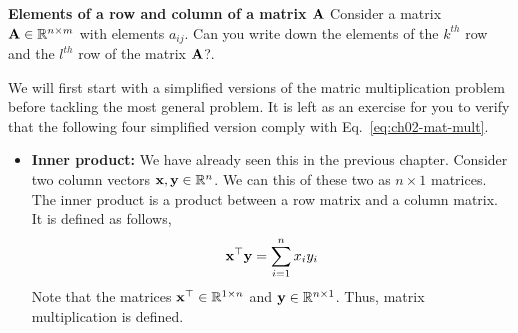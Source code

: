 \begin{boxedstuff}
    \begin{problem}
        \textbf{Elements of a row and column of a matrix $\mathbf{A}$} Consider a matrix $\mathbf{A} \in \mathbb{R}^{n \times m}$ with elements $a_{ij}$. Can you write down the elements of the $k^{th}$ row and the $l^{th}$ row of the matrix $\mathbf{A}$?.
    \end{problem}
\end{boxedstuff}
We will first start with a simplified versions of the matric multiplication problem before tackling the most general problem. It is left as an exercise for you to verify that the following four simplified version comply with Eq.~\ref{eq:ch02-mat-mult}.
\begin{itemize}
    \item \textbf{Inner product:} We have already seen this in the previous chapter. Consider two column vectors $\mathbf{x}, \mathbf{y} \in \mathbb{R}^n$. We can this of these two as $n \times 1$ matrices. The inner product is a product between a row matrix and a column matrix. It is defined as follows, 
    \[ \mathbf{x}^\top\mathbf{y} = \sum_{i=1}^{n} x_iy_i \]
    Note that the matrices $\mathbf{x}^\top \in \mathbb{R}^{1 \times n}$ and $\mathbf{y} \in \mathbb{R}^{n \times 1}$. Thus, matrix multiplication is defined.
    

\end{itemize}
